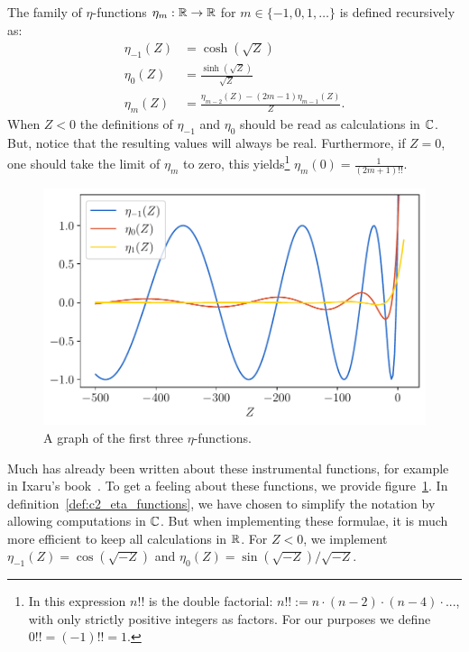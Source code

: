 \begin{definition}[Ixaru 1984]\label{def:c2_eta_functions}
    The family of $\eta$-functions $\eta_m : \mathbb{R} \to \mathbb{R}$ for $m \in \{-1, 0, 1, \dots\}$ is defined recursively as:
    \begin{align*}
        \eta_{-1}(Z) & = \cosh(\sqrt{Z})                                        \\
        \eta_{0}(Z)  & = \frac{\sinh(\sqrt{Z})}{\sqrt{Z}}                       \\
        \eta_{m}(Z)  & = \frac{\eta_{m-2}(Z) - (2m-1) \eta_{m-1}(Z)}{Z}\text{.}
    \end{align*}
    When $Z < 0$ the definitions of $\eta_{-1}$ and $\eta_{0}$ should be read as calculations in $\mathbb{C}$. But, notice that the resulting values will always be real. Furthermore, if $Z = 0$, one should take the limit of $\eta_m$ to zero, this yields\footnote{In this expression $n!!$ is the double factorial: $n!! := n\cdot (n-2) \cdot (n - 4) \cdot ...$, with only strictly positive integers as factors. For our purposes we define $0!! = (-1)!! = 1$.} $\eta_m(0) = \frac{1}{(2m+1)!!}$.
\end{definition}

\begin{figure}
    \begin{center}
        \includegraphics[width=\textwidth]{img/chapter2/eta_functions.pdf}
    \end{center}
    \caption{A graph of the first three $\eta$-functions.}\label{fig:c2_eta_functions}
\end{figure}

Much has already been written about these instrumental functions, for example in Ixaru's book~\cite{ixaru_numerical_1984}. To get a feeling about these functions, we provide figure~\ref{fig:c2_eta_functions}. In definition~\ref{def:c2_eta_functions}, we have chosen to simplify the notation by allowing computations in $\mathbb{C}$. But when implementing these formulae, it is much more efficient to keep all calculations in $\mathbb{R}$. For $Z < 0$, we implement $\eta_{-1}(Z) = \cos(\sqrt{-Z})$ and $\eta_{0}(Z) = \sin(\sqrt{-Z})/\sqrt{-Z}$.

